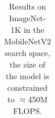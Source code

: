 \begin{table}
\begin{tabular}{@{}lcccc@{}}
    \bottomrule
  \end{tabular}
  \caption{Results on ImageNet-1K \cite{deng2009imagenet} in the MobileNetV2 search space, the size of the model is constrained to $\approx$450M FLOPS. %
  }
  \label{tab:mobileNertQuantiative}
\end{table}

